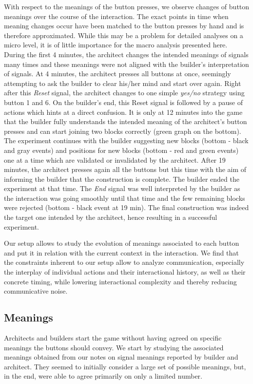 With respect to the meanings of the button presses, we observe changes of button meanings over the course of the interaction. The exact points in time when meaning changes occur have been matched to the button presses by hand and is therefore approximated. While this may be a problem for detailed analyses on a micro level, it is of little importance for the macro analysis presented here. During the first 4 minutes, the architect changes the intended meanings of signals many times and these meanings were not aligned with the builder's interpretation of signals. At 4 minutes, the architect presses all buttons at once, seemingly attempting to ask the builder to clear his/her mind and start over again. Right after this \emph{Reset} signal, the architect changes to one simple \emph{yes/no} strategy using button 1 and 6. On the builder's end, this Reset signal is followed by a pause of actions which hints at a direct confusion. It is only at 12 minutes into the game that the builder fully understands the intended meaning of the architect's button presses and can start joining two blocks correctly (green graph on the bottom). The experiment continues with the builder suggesting new blocks (bottom - black and gray events) and positions for new blocks (bottom - red and green events) one at a time which are validated or invalidated by the architect. After 19 minutes, the architect presses again all the buttons but this time with the aim of informing the builder that the construction is complete. The builder ended the experiment at that time. The \emph{End} signal was well interpreted by the builder as the interaction was going smoothly until that time and the few remaining blocks were rejected (bottom - black event at 19 min). The final construction was indeed the target one intended by the architect, hence resulting in a successful experiment.

Our setup allows to study the evolution of meanings associated to each button and put it in relation with the current context in the interaction. We find that the constraints inherent to our setup allow to analyze communication, especially the interplay of individual actions and their interactional history, as well as their concrete timing, while lowering interactional complexity and thereby reducing communicative noise.

\subsection{Meanings}

Architects and builders start the game without having agreed on specific meanings the buttons should convey. We start by studying the associated meanings obtained from our notes on signal meanings reported by builder and architect. They seemed to initially consider a large set of possible meanings, but, in the end, were able to agree primarily on only a limited number.

